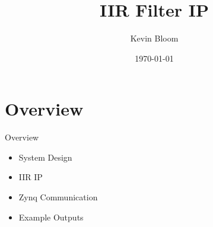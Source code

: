 \documentclass{beamer}
\title{IIR Filter IP}
\date{\today}
\author{Kevin Bloom}
\institute{Pennsylvania College of Technology}
\begin{document}
\maketitle

\section{Overview}
\begin{frame}{Overview}
  \begin{itemize}[<+>]
  \item System Design
  \item IIR IP
  \item Zynq Communication
  \item Example Outputs
  \end{itemize}
\end{frame}
\end{document}
